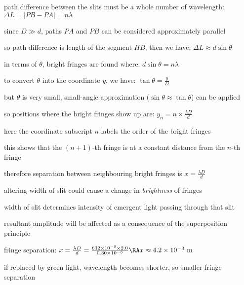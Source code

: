 path difference between the slits must be a whole number of wavelength: $ \Delta L = \big|PB-PA\big| = n\lambda $

since $D \gg d$, paths $PA$ and $PB$ can be considered approximately parallel

so path difference is length of the segment $HB$, then we have: $\Delta L \approx d\sin\theta$

in terms of $\theta$, bright fringes are found where: $ d\sin\theta = n\lambda $

to convert $\theta$ into the coordinate $y$, we have: $\tan \theta = \frac{y}{D}$

but $\theta$ is very small, small-angle approximation ($\sin \theta \approx \tan \theta$) can be applied

so positions where the bright fringes show up are: $ y_n =  n \times \frac{\lambda D}{d} $

here the coordinate subscript $n$ labels the order of the bright fringes

this shows that the $(n+1)$-th fringe is at a constant distance from the $n$-th fringe

therefore separation between neighbouring bright fringes is $ {x=\frac{\lambda D}{d}} $ \eoe

\cmt altering width of slit could cause a change in \emph{brightness} of fringes

width of slit determines intensity of emergent light passing through that slit

resultant amplitude will be affected as a consequence of the superposition principle


\sol fringe separation: $ x = \frac{\lambda D}{d} = \frac{632 \times 10^{-9} \times 2.0 }{0.30 \times 10^{-3}} \RA x \approx 4.2 \times 10^{-3} \text{ m}$

if replaced by green light, wavelength becomes shorter, so smaller fringe separation \eoe



